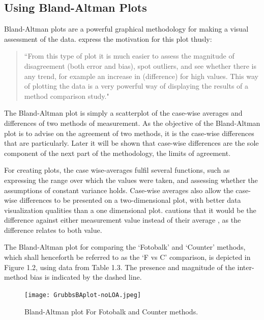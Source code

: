 \documentclass[12pt, a4paper]{report}
\begin{document}
\newpage


\subsection{Using Bland-Altman Plots}
Bland-Altman plots are a powerful graphical methodology for making
a visual assessment of the data. \citet*{BA83} express the
motivation for this plot thusly:
\begin{quote}
``From this type of plot it is much easier to assess the magnitude
of disagreement (both error and bias), spot outliers, and see
whether there is any trend, for example an increase in
(difference) for high values. This way of plotting the data is a
very powerful way of displaying the results of a method comparison
study."
\end{quote}

The Bland-Altman plot is simply a scatterplot of the case-wise
averages and differences of two methods of measurement. As the
objective of the Bland-Altman plot is to advise on the agreement
of two methods, it is the case-wise differences that are
particularly. Later it will be shown that case-wise differences
are the sole component of the next part of the methodology, the
limits of agreement.

For creating plots, the case wise-averages fulfil several
functions, such as expressing the range over which the values were
taken, and assessing whether the assumptions of constant variance
holds. Case-wise averages also allow the case-wise differences to
be presented on a two-dimensional plot, with better data
visualization qualities than a one dimensional plot. \citet{BA86}
cautions that it would be the difference against either
measurement value instead of their average , as the difference
relates to both value.

The Bland-Altman plot for comparing the `Fotobalk' and `Counter'
methods, which shall henceforth be referred to as the `F vs C'
comparison,  is depicted in Figure 1.2, using data from Table 1.3.
The presence and magnitude of the inter-method bias is indicated
by the dashed line.

\begin{figure}[h!]
\begin{center}
  \texttt{[image: GrubbsBAplot-noLOA.jpeg]}
  \caption{Bland-Altman plot For Fotobalk and Counter methods.}\label{GrubbsBA-noLOA}
\end{center}
\end{figure}
\end{document}
